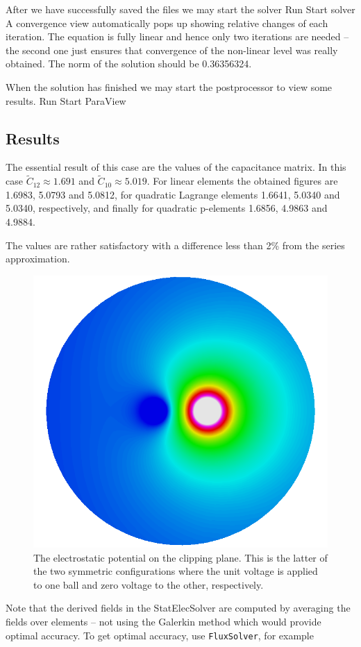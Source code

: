 After we have successfully saved the files we may start the solver
\ttbegin
Run
  Start solver
\ttend
A convergence view automatically pops up showing relative changes of each iteration.
The equation is fully linear and hence only two iterations are needed -- the second 
one just ensures that convergence of the non-linear level was really obtained. 
The norm of the solution should be 0.36356324.

When the solution has finished we may start the postprocessor to view some results.
\ttbegin
Run
  Start ParaView
\ttend


\subsection*{Results}

The essential result of this case are the values of the capacitance matrix.
In this case $\tilde{C}_{12} \approx 1.691$ and $\tilde{C}_{10} \approx 5.019$.
For linear elements the obtained figures are 1.6983, 5.0793 and 5.0812, 
for quadratic Lagrange elements 1.6641, 5.0340 and 5.0340, respectively, and
finally for quadratic p-elements 1.6856, 4.9863 and 4.9884. 

The values are rather satisfactory with a difference less than 2\% from the series approximation.


\begin{figure}[h]
\centering
\includegraphics[width=120 mm]{ElmerPost_capture2}
\caption{The electrostatic potential on the clipping plane. This is the latter of the two symmetric configurations where the
unit voltage is applied to one ball and zero voltage to the other, respectively.}\label{fg:ballspost}
\end{figure}  

Note that the derived fields in the StatElecSolver are computed 
by averaging the fields over elements -- not using the 
Galerkin method which would provide optimal accuracy. To get optimal accuracy, use 
\texttt{FluxSolver}, for example


\hfill



